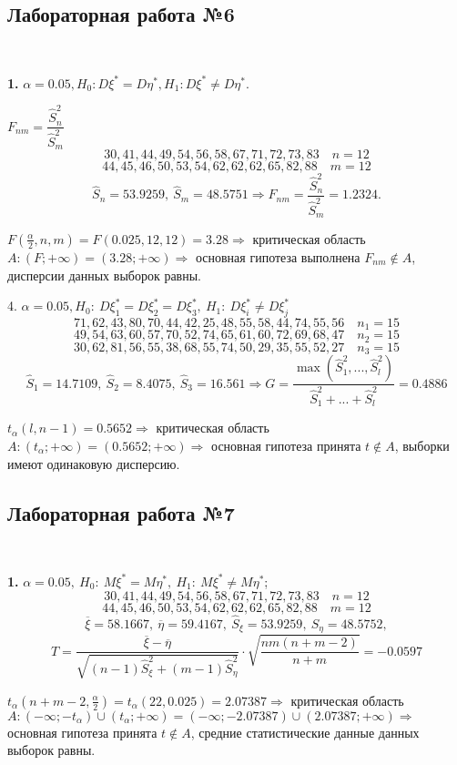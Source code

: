 \documentclass[9pt]{article}
\begin{document}
\subsection{Лабораторная работа №6}

\ 
\par\textbf{1.} \(\alpha=0.05, H_0: D\xi^*=D\eta^*,H_1:D\xi^*\neq D\eta^*\).
\par\(F_{nm}=\dfrac{\hat S_n^2}{\hat S_m^2}\)
\[30,41,44,49,54,56,58,67,71,72,73,83\quad n=12\]
\[44,45,46,50,53,54,62,62,62,65,82,88\quad m=12\]
\[\hat S_n=53.9259,\ \hat S_m=48.5751\Rightarrow F_{nm}=\dfrac{\hat S_n^2}{\hat S_m^2}=1.2324.\]
\par\(F(\frac{\alpha}{2},n,m)=F(0.025,12,12)=3.28\Rightarrow\) критическая область \(A:(F;+\infty)=(3.28;+\infty)\Rightarrow\) основная гипотеза выполнена \(F_{nm}\notin A\), дисперсии данных выборок равны.
\par4. \(\alpha=0.05,H_0:\ D\xi_1^*=D\xi_2^*=D\xi_3^*,\ H_1:\ D\xi_i^*\neq D\xi_j^*\)
\[71, 62, 43, 80, 70, 44, 42, 25, 48, 55, 58, 44, 74, 55, 56\quad n_1=15\]
\[49, 54, 63, 60, 57, 70, 52, 74, 65, 61, 60, 72, 69, 68, 47\quad n_2=15\]
\[30, 62, 81, 56, 55, 38, 68, 55, 74, 50, 29, 35, 55, 52, 27\quad n_3=15\]
\[\hat S_1=14.7109,\ \hat S_2=8.4075,\ \hat S_3=16.561\Rightarrow G=\dfrac{\max(\hat S_1^2,...,\hat S_l^2)}{\hat S_1^2+...+\hat S_l^2}=0.4886\]
\par\(t_\alpha(l,n-1)=0.5652\Rightarrow\) критическая область \(A:(t_\alpha;+\infty)=(0.5652;+\infty)\Rightarrow\) основная гипотеза принята \(t\notin A\), выборки имеют одинаковую дисперсию.

\subsection{Лабораторная работа №7}

\ 
\par\textbf{1.} \(\alpha=0.05,\ H_0:\ M\xi^*=M\eta^*,\ H_1:\ M\xi^*\neq M\eta^*\);
\[30,41,44,49,54,56,58,67,71,72,73,83\quad n=12\]
\[44,45,46,50,53,54,62,62,62,65,82,88\quad m=12\]
\[\overline{\xi}=58.1667,\ \overline{\eta}=59.4167,\ \hat S_\xi=53.9259,\ \hat S_\eta=48.5752,\] \[T=\dfrac{\overline\xi-\overline{\eta}}{\sqrt{(n-1)\hat S_\xi^2+(m-1)\hat S^2_\eta}}\cdot\sqrt{\dfrac{nm(n+m-2)}{n+m}}=-0.0597\]
\par\(t_\alpha(n+m-2,\frac{\alpha}{2})=t_\alpha(22,0.025)=2.07387\Rightarrow\) критическая область \(A:(-\infty;-t_\alpha)\cup(t_\alpha;+\infty)=(-\infty;-2.07387)\cup(2.07387;+\infty)\Rightarrow\) основная гипотеза принята \(t\notin A\), средние статистические данные данных выборок равны.
\end{document}
